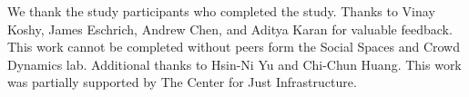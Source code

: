 \begin{acks}
We thank the study participants who completed the study. Thanks to Vinay Koshy, James Eschrich, Andrew Chen, and Aditya Karan for valuable feedback. This work cannot be completed without peers form the Social Spaces and Crowd Dynamics lab. Additional thanks to Hsin-Ni Yu and Chi-Chun Huang. This work was partially supported by The Center for Just Infrastructure.
\end{acks}

